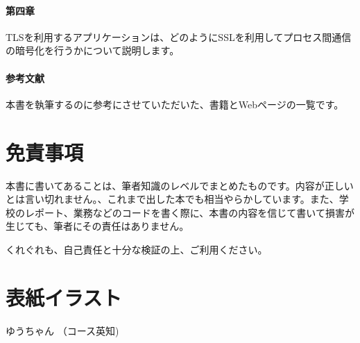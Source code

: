 \paragraph{第四章}
TLSを利用するアプリケーションは、どのようにSSLを利用してプロセス間通信の暗号化を行うかについて説明します。

\paragraph{参考文献}
本書を執筆するのに参考にさせていただいた、書籍とWebページの一覧です。

\section*{免責事項}
本書に書いてあることは、筆者知識のレベルでまとめたものです。内容が正しいとは言い切れません。、これまで出した本でも相当やらかしています。また、学校のレポート、業務などのコードを書く際に、本書の内容を信じて書いて損害が生じても、筆者にその責任はありません。

くれぐれも、自己責任と十分な検証の上、ご利用ください。

\section*{表紙イラスト}
ゆうちゃん （コース英知)